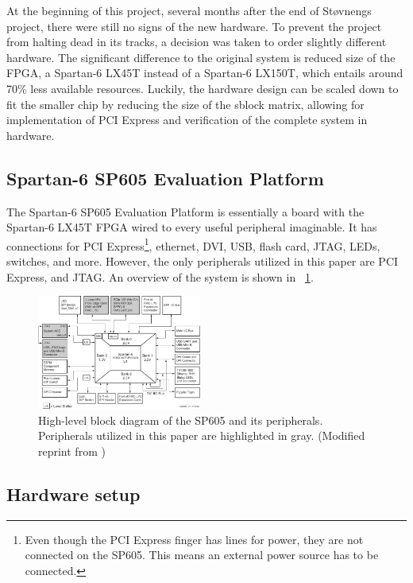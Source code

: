 At the beginning of this project, several months after the end of Støvnengs project, there were still no signs of the new hardware.
To prevent the project from halting dead in its tracks, a decision was taken to order slightly different hardware.
The significant difference to the original system is reduced size of the FPGA, a Spartan-6 LX45T instead of a Spartan-6 LX150T, which entails around 70\% less available resources.
Luckily, the hardware design can be scaled down to fit the smaller chip by reducing the size of the sblock matrix, allowing for implementation of PCI Express and verification of the complete system in hardware.

\subsection{Spartan-6 SP605 Evaluation Platform}

The Spartan-6 SP605 Evaluation Platform is essentially a board with the Spartan-6 LX45T FPGA wired to every useful peripheral imaginable.
It has connections for PCI Express\footnote{
        Even though the PCI Express finger has lines for power, they are not connected on the SP605. This means an external power source has to be connected.
    }, ethernet, DVI, USB, flash card, JTAG, LEDs, switches, and more.
However, the only peripherals utilized in this paper are PCI Express, and JTAG.
An overview of the system is shown in \figurename~\ref{fig:sp605}.

\begin{figure}[!ht]
    \centering
    \includegraphics[width=0.48\textwidth]{figures/sp605-modified}
    \caption{High-level block diagram of the SP605 and its peripherals. Peripherals utilized in this paper are highlighted in gray. (Modified reprint from \cite{ug526})}
    \label{fig:sp605}
\end{figure}


\subsection{Hardware setup}

